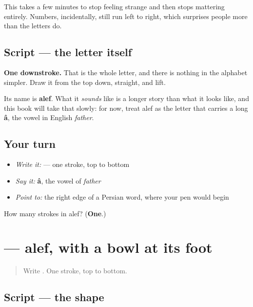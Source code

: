 This takes a few minutes to stop feeling strange and then stops mattering entirely. Numbers, incidentally, still run left to right, which surprises people more than the letters do.

\subsection*{Script — the letter itself}
\begin{quote}
\end{quote}

\textbf{One downstroke.} That is the whole letter, and there is nothing in the alphabet simpler. Draw it from the top down, straight, and lift.

Its name is \textbf{alef}. What it \emph{sounds} like is a longer story than what it looks like, and this book will take that slowly: for now, treat alef as the letter that carries a long \textbf{â}, the vowel in English \emph{father}.

\subsection*{Your turn}
\begin{itemize}
\raggedright
  \item \emph{Write it:}  — one stroke, top to bottom
  \item \emph{Say it:} \textbf{â}, the vowel of \emph{father}
  \item \emph{Point to:} the right edge of a Persian word, where your pen would begin
\end{itemize}

\begin{tcolorbox}[breakable,colback=teal!4,colframe=teal!35!black,title={Before you move on}]
How many strokes in alef? (\textbf{One}.)
\end{tcolorbox}
\section[\texorpdfstring{\fa{ل} (lâm)}{ل (lâm)}]{ — alef, with a bowl at its foot}

\label{lesson:FA-W15-lam}



\begin{quote}
Write . One stroke, top to bottom.
\end{quote}

\subsection*{Script — the shape}

